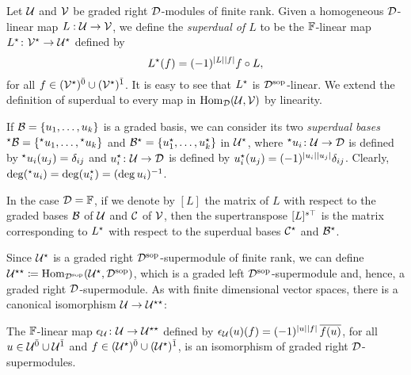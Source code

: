 \begin{defi}\label{defi:superdual-map}
    Let $\mathcal U$ and $\mathcal V$ be graded right $\mathcal{D}$-modules of finite rank. 
    Given a homogeneous $\mathcal{D}$-linear map
    $L:\mathcal U \rightarrow \mathcal V$, we define the \emph{superdual of $L$} to be the $\mathbb{F}$-linear map $L^\star\colon \mathcal V^\star \rightarrow \mathcal U^\star$ defined by
    \[
        L^\star (f) = (-1)^{|L||f|} f \circ L,
    \] 
    for all $f\in (\mathcal V^\star)^{\bar0} \cup (\mathcal V^\star)^{\bar1}$. 
    It is easy to see that $L^\star$ is $\mathcal{D}^{\mathrm{sop}}$-linear. 
    We extend the definition of superdual to every map in $\operatorname{Hom}_{\mathcal{D}} (\mathcal U, \mathcal V)$ by linearity.
\end{defi}

\begin{defi}\label{defi:two-dual-bases}
    If $\mathcal B = \{u_1, \ldots, u_k\}$ is a graded basis, we can consider its two \emph{superdual bases} ${}^\star \mathcal B = \{{}^\star u_1, \ldots, {}^\star u_k\}$ and $\mathcal B^\star = \{u_1^\star, \ldots, u_k^\star\}$ in $\mathcal U^\star$, where ${}^\star u_i \colon \mathcal U \rightarrow \mathcal{D}$ is defined by ${}^\star u_i(u_j) = \delta_{ij}$ and $u_i^\star \colon \mathcal U \rightarrow \mathcal{D}$ is defined by $u_i^\star (u_j) = (-1)^{|u_i||u_j|} \delta_{ij}$. 
    Clearly, $\deg ({}^\star u_i) = \deg  (u_i^\star) = (\deg u_i)^{-1}$. 
\end{defi}

\begin{remark}
	In the case $\mathcal{D}=\mathbb{F}$, if we denote by $[L]$ the matrix of $L$ with respect to the graded bases $\mathcal B$ of $\mathcal U$ and $\mathcal C$ of $\mathcal V$, then the supertranspose $[L]^{s\top}$ is the matrix corresponding to $L^\star$ with respect to the superdual bases $\mathcal C^\star$ and $\mathcal B^\star$.
\end{remark}

Since $\mathcal U^\star$ is a graded right $\mathcal{D}^{\mathrm{sop}}$-supermodule of finite rank, we can define $\mathcal U^{\star\star} \coloneqq \operatorname{Hom}_{\mathcal{D}^{\mathrm{sop}}} (\mathcal U^\star, \mathcal{D}^{\mathrm{sop}})$, which is a graded left $\mathcal{D}^{\mathrm{sop}}$-supermodule and, hence, a graded right $\mathcal{D}$-supermodule. 
As with finite dimensional vector spaces, there is a canonical isomorphism $\mathcal U \to \mathcal U^{\star\star}$: 

\begin{lemma}\label{lemma:double-dual}
    The $\mathbb{F}$-linear map $\epsilon_\mathcal U\colon \mathcal U \to \mathcal U^{\star\star}$ defined by $\epsilon_\mathcal U(u)(f) = (-1)^{|u||f|}\, \overline{f(u)}$, for all $u \in \mathcal U^{\bar0} \cup \mathcal U^{\bar1}$ and $f \in (\mathcal U^\star)^{\bar0} \cup (\mathcal U^\star)^{\bar1}$, is an isomorphism of graded right $\mathcal{D}$-supermodules. 
\end{lemma}

